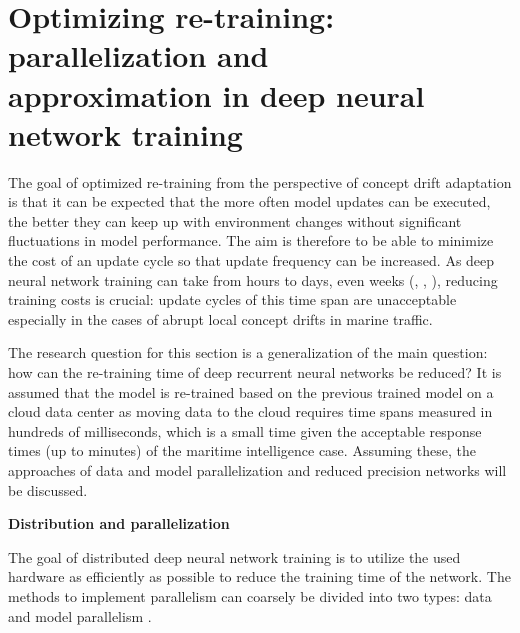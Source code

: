 
\section[Optimizing re-training: parallelization and approximation in deep neural network training]{Optimizing re-training: parallelization and \\approximation in deep neural network training}



The goal of optimized re-training from the perspective of concept drift adaptation is that it can be expected that the more often model updates can be executed, the better they can keep up with environment changes without significant fluctuations in model performance. The aim is therefore to be able to minimize the cost of an update cycle so that update frequency can be increased. As deep neural network training can take from hours to days, even weeks (\cite{szeEfficientProcessingDeep2017}, \cite{jia_highly_2018}, \cite{de_sa_high-accuracy_2018}), reducing training costs is crucial: update cycles of this time span are unacceptable especially in the cases of abrupt local concept drifts in marine traffic.

The research question for this section is a generalization of the main question: how can the re-training time of deep recurrent neural networks be reduced? It is assumed that the model is re-trained based on the previous trained model on a cloud data center as moving data to the cloud requires time spans measured in hundreds of milliseconds, which is a small time given the acceptable response times (up to minutes) of the maritime intelligence case. Assuming these, the approaches of data and model parallelization and reduced precision networks will be discussed.

\textbf{Distribution and parallelization}

The goal of distributed deep neural network training is to utilize the used hardware as efficiently as possible to reduce the training time of the network. The methods to implement parallelism can coarsely be divided into two types: data and model parallelism \cite{ben-nunDemystifyingParallelDistributed2019}.

